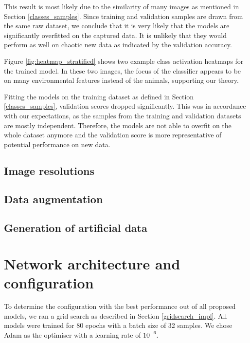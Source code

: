 \documentclass{l4proj}
\begin{document}
This result is most likely due to the similarity of many images as mentioned in Section \ref{classes_samples}. Since training and validation samples are drawn from the same raw dataset, we conclude that it is very likely that the models are significantly overfitted on the captured data. It is unlikely that they would perform as well on chaotic new data as indicated by the validation accuracy. 

Figure \ref{fig:heatmap_stratified} shows two example class activation heatmaps for the trained model. In these two images, the focus of the classifier appears to be on many environmental features instead of the animals, supporting our theory.

Fitting the models on the training dataset as defined in Section \ref{classes_samples}, validation scores dropped significantly. This was in accordance with our expectations, as the samples from the training and validation datasets are mostly independent. Therefore, the models are not able to overfit on the whole dataset anymore and the validation score is more representative of potential performance on new data.

\subsection{Image resolutions}

\subsection{Data augmentation}

\subsection{Generation of artificial data}


\section{Network architecture and configuration}

To determine the configuration with the best performance out of all proposed models, we ran a grid search as described in Section \ref{gridsearch_impl}. All models were trained for 80 epochs with a batch size of 32 samples. We chose Adam as the optimiser with a learning rate of $10^{-6}$. 
\end{document}
